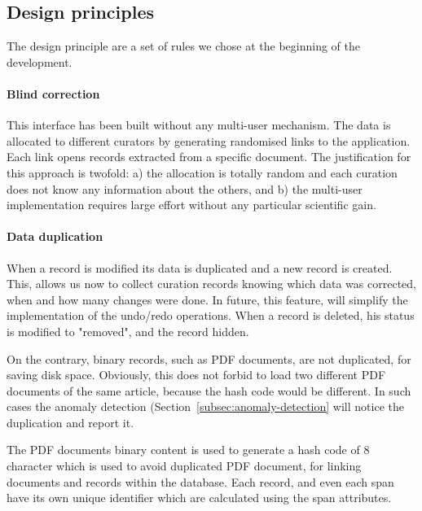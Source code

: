 \documentclass{article}
\begin{document}

\subsection{Design principles}
\label{subsec:design-principles}

The design principle are a set of rules we chose at the beginning of the development. 

\paragraph{Blind correction}
This interface has been built without any multi-user mechanism. 
The data is allocated to different curators by generating randomised links to the application. Each link opens records extracted from a specific document. 
The justification for this approach is twofold: a) the allocation is totally random and each curation does not know any information about the others, and b) the multi-user implementation requires large effort without any particular scientific gain. 

\paragraph{Data duplication} When a record is modified its data is duplicated and a new record is created. 
This, allows us now to collect curation records knowing which data was corrected, when and how many changes were done. In future, this feature, will simplify the implementation of the undo/redo operations. 
When a record is deleted, his status is modified to "removed", and the record hidden. 

On the contrary, binary records, such as PDF documents, are not duplicated, for saving disk space. Obviously, this does not forbid to load two different PDF documents of the same article, because the hash code would be different. In such cases the anomaly detection (Section~\ref{subsec:anomaly-detection} will notice the duplication and report it. 

The PDF documents binary content is used to generate a hash code of 8 character which is used to avoid duplicated PDF document, for linking documents and records within the database. Each record, and even each span have its own unique identifier which are calculated using the span attributes.
\end{document}
